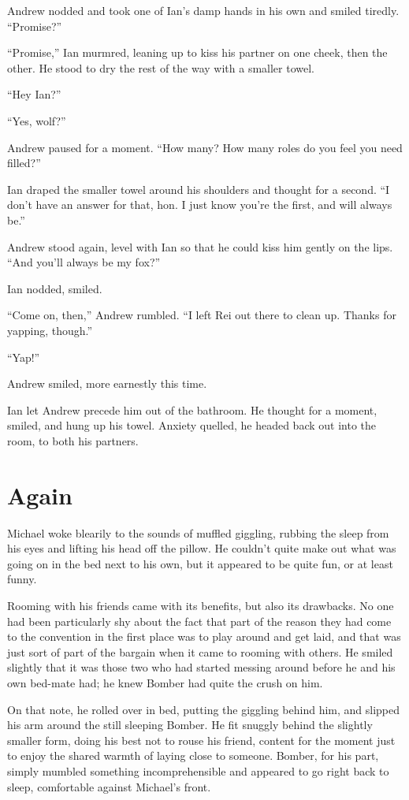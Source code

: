 \documentclass[12pt,letterpaper,oneside]{memoir}
\begin{document}
  Andrew nodded and took one of Ian's damp hands in his own and smiled tiredly. ``Promise?''

  ``Promise,'' Ian murmred, leaning up to kiss his partner on one cheek, then the other. He stood to dry the rest of the way with a smaller towel.

  ``Hey Ian?''

  ``Yes, wolf?''

  Andrew paused for a moment. ``How many? How many roles do you feel you need filled?''

  Ian draped the smaller towel around his shoulders and thought for a second. ``I don't have an answer for that, hon. I just know you're the first, and will always be.''

  Andrew stood again, level with Ian so that he could kiss him gently on the lips. ``And you'll always be my fox?''

  Ian nodded, smiled.

  ``Come on, then,'' Andrew rumbled. ``I left Rei out there to clean up. Thanks for yapping, though.''

  ``Yap!''

  Andrew smiled, more earnestly this time.

  Ian let Andrew precede him out of the bathroom. He thought for a moment, smiled, and hung up his towel. Anxiety quelled, he headed back out into the room, to both his partners.

  \chapter{Again}

  Michael woke blearily to the sounds of muffled giggling, rubbing the sleep from his eyes and lifting his head off the pillow.  He couldn't quite make out what was going on in the bed next to his own, but it appeared to be quite fun, or at least funny.

  Rooming with his friends came with its benefits, but also its drawbacks. No one had been particularly shy about the fact that part of the reason they had come to the convention in the first place was to play around and get laid, and that was just sort of part of the bargain when it came to rooming with others.  He smiled slightly that it was those two who had started messing around before he and his own bed-mate had; he knew Bomber had quite the crush on him.

  On that note, he rolled over in bed, putting the giggling behind him, and slipped his arm around the still sleeping Bomber.  He fit snuggly behind the slightly smaller form, doing his best not to rouse his friend, content for the moment just to enjoy the shared warmth of laying close to someone.  Bomber, for his part, simply mumbled something incomprehensible and appeared to go right back to sleep, comfortable against Michael's front.
\end{document}
